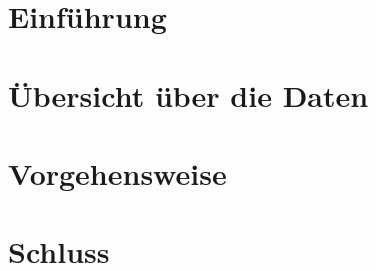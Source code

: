 \documentclass[
	a4paper, %
	12pt, %
	twoside, %
	BCOR=5mm, %
	fleqn, %
	bibliography=totoc, %
]{report}
\begin{document}
	

	\begin{abstract}
		\lipsum[1]
	\end{abstract}

	\tableofcontents

	\chapter{Einführung}
	
	
	
	\chapter{Übersicht über die Daten}
	
	
	
	\chapter{Vorgehensweise}
	
	
	\chapter{Schluss}
	

	\newpage
	
\end{document}
